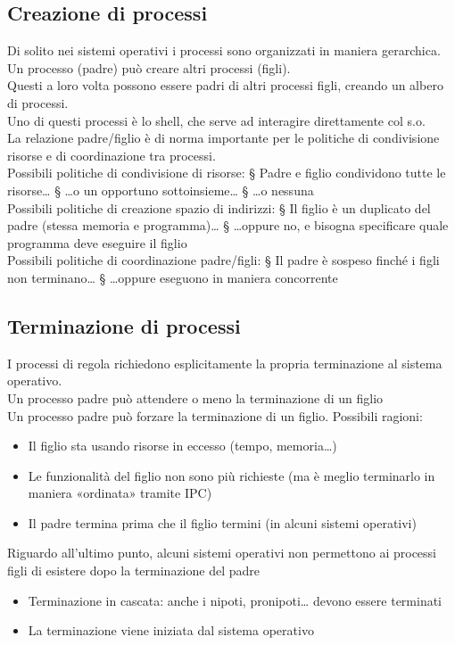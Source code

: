 \subsection{Creazione di processi}
Di solito nei sistemi operativi i processi sono organizzati in maniera gerarchica.
\\Un processo (padre) può creare altri processi (figli).
\\Questi a loro volta possono essere padri di altri processi figli, creando un albero di processi.
\\Uno di questi processi è lo shell, che serve ad interagire direttamente col s.o.
\\La relazione padre/figlio è di norma importante per le politiche di condivisione risorse e di coordinazione tra processi.
\\Possibili politiche di condivisione di risorse:
§ Padre e figlio condividono tutte le risorse…
§ …o un opportuno sottoinsieme…
§ …o nessuna
\\Possibili politiche di creazione spazio di indirizzi:
§ Il figlio è un duplicato del padre (stessa memoria e
programma)…
§ …oppure no, e bisogna specificare quale
programma deve eseguire il figlio
\\Possibili politiche di coordinazione padre/figli:
§ Il padre è sospeso finché i figli non terminano…
§ …oppure eseguono in maniera concorrente

\subsection{Terminazione di processi}
I processi di regola richiedono esplicitamente la propria terminazione al sistema operativo.
\\Un processo padre può attendere o meno la terminazione di un figlio
\\Un processo padre può forzare la terminazione di un figlio. Possibili ragioni:
\begin{itemize}
    \item Il figlio sta usando risorse in eccesso (tempo, memoria…)
    \item Le funzionalità del figlio non sono più richieste (ma è meglio terminarlo in maniera «ordinata» tramite IPC)
    \item Il padre termina prima che il figlio termini (in alcuni sistemi operativi)
\end{itemize}
Riguardo all'ultimo punto, alcuni sistemi operativi non permettono ai processi figli di esistere dopo la terminazione del padre
\begin{itemize}
    \item Terminazione in cascata: anche i nipoti, pronipoti… devono essere terminati
    \item La terminazione viene iniziata dal sistema operativo
\end{itemize}

